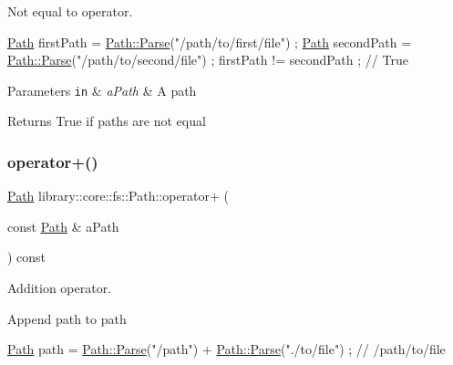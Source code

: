 Not equal to operator. 


\begin{DoxyCode}
\hyperlink{classlibrary_1_1core_1_1fs_1_1_path_aabc4240fc08479d1bff6b9753f2b5cc2}{Path} firstPath = \hyperlink{classlibrary_1_1core_1_1fs_1_1_path_a6ba644b6609507e724c217bf2020f5ae}{Path::Parse}(\textcolor{stringliteral}{"/path/to/first/file"}) ;
\hyperlink{classlibrary_1_1core_1_1fs_1_1_path_aabc4240fc08479d1bff6b9753f2b5cc2}{Path} secondPath = \hyperlink{classlibrary_1_1core_1_1fs_1_1_path_a6ba644b6609507e724c217bf2020f5ae}{Path::Parse}(\textcolor{stringliteral}{"/path/to/second/file"}) ;
firstPath != secondPath ; \textcolor{comment}{// True}
\end{DoxyCode}



\begin{DoxyParams}[1]{Parameters}
\mbox{\tt in}  & {\em a\+Path} & A path \\
\hline
\end{DoxyParams}
\begin{DoxyReturn}{Returns}
True if paths are not equal 
\end{DoxyReturn}
\mbox{\label{classlibrary_1_1core_1_1fs_1_1_path_a3f86a7054939a51f44b2f5a796470071}} 
\subsubsection{\texorpdfstring{operator+()}{operator+()}}
{\footnotesize\ttfamily \hyperlink{classlibrary_1_1core_1_1fs_1_1_path}{Path} library\+::core\+::fs\+::\+Path\+::operator+ (\begin{DoxyParamCaption}\item[{const \hyperlink{classlibrary_1_1core_1_1fs_1_1_path}{Path} \&}]{a\+Path }\end{DoxyParamCaption}) const}



Addition operator. 

Append path to path


\begin{DoxyCode}
\hyperlink{classlibrary_1_1core_1_1fs_1_1_path_aabc4240fc08479d1bff6b9753f2b5cc2}{Path} path = \hyperlink{classlibrary_1_1core_1_1fs_1_1_path_a6ba644b6609507e724c217bf2020f5ae}{Path::Parse}(\textcolor{stringliteral}{"/path"}) + \hyperlink{classlibrary_1_1core_1_1fs_1_1_path_a6ba644b6609507e724c217bf2020f5ae}{Path::Parse}(\textcolor{stringliteral}{"./to/file"}) ; \textcolor{comment}{// /path/to/file}
\end{DoxyCode}



